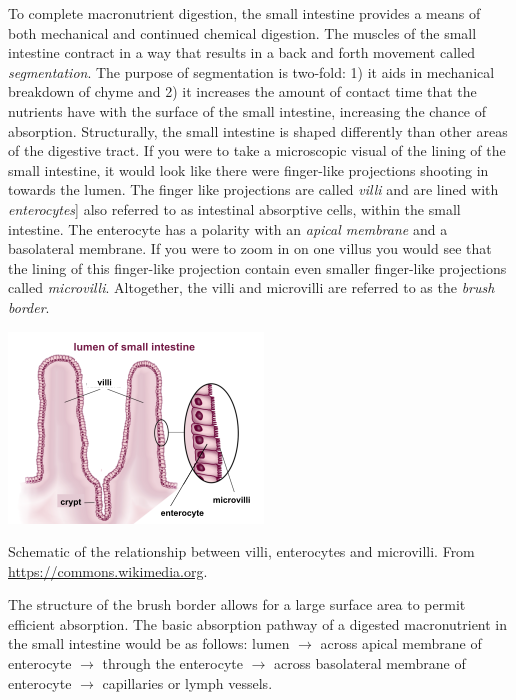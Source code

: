 \documentclass{tufte-handout}
\begin{document}
To complete macronutrient digestion, the small intestine provides a means of both mechanical and continued chemical digestion. The muscles of the small intestine contract in a way that results in a back and forth movement called \emph{segmentation}. The purpose of segmentation is two-fold: 1) it aids in mechanical breakdown of chyme and 2) it increases the amount of contact time that the nutrients have with the surface of the small intestine, increasing the chance of absorption. Structurally, the small intestine is shaped differently than other areas of the digestive tract. If you were to take a microscopic visual of the lining of the small intestine, it would look like there were finger-like projections shooting in towards the lumen. The finger like projections are called \emph{villi} and are lined with \emph{enterocytes}] also referred to as intestinal absorptive cells, within the small intestine. The enterocyte has a polarity with an \emph{apical membrane} and a basolateral membrane. If you were to zoom in on one villus you would see that the lining of this finger-like projection contain even smaller finger-like projections called \emph{microvilli}. Altogether, the villi and microvilli are referred to as the \emph{brush border}.

\begin{marginfigure}
\includegraphics{figures/enterocyte-villi}
\caption{Schematic of the relationship between villi, enterocytes and microvilli.  From \url{https://commons.wikimedia.org}.}
\end{marginfigure}

The structure of the brush border allows for a large surface area to permit efficient absorption. The basic absorption pathway of a digested macronutrient in the small intestine would be as follows: lumen $\rightarrow$ across apical membrane of enterocyte $\rightarrow$ through the enterocyte $\rightarrow$ across basolateral membrane of enterocyte $\rightarrow$ capillaries or lymph vessels.   
\end{document}
